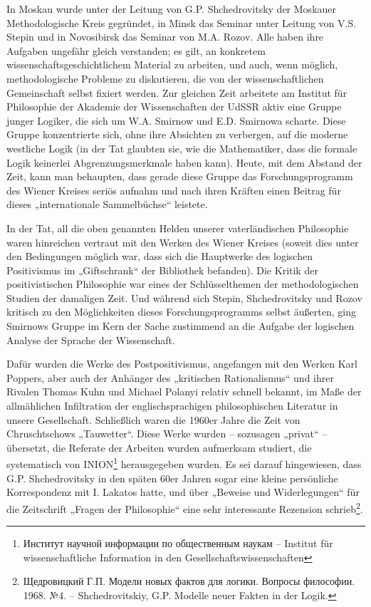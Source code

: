 \documentclass[11pt,a4paper]{article}
\begin{document}
In Moskau wurde unter der Leitung von G.P. Shchedrovitsky der Moskauer
Methodologische Kreis gegründet, in Minsk das Seminar unter Leitung von
V.S. Stepin und in Novosibirsk das Seminar von M.A. Rozov. Alle haben ihre
Aufgaben ungefähr gleich verstanden; es gilt, an konkretem
wissenschaftsgeschichtlichem Material zu arbeiten, und auch, wenn möglich,
methodologische Probleme zu diskutieren, die von der wissenschaftlichen
Gemeinschaft selbst fixiert werden. Zur gleichen Zeit arbeitete am Institut
für Philosophie der Akademie der Wissenschaften der UdSSR aktiv eine Gruppe
junger Logiker, die sich um W.A. Smirnow und E.D. Smirnowa scharte. Diese
Gruppe konzentrierte sich, ohne ihre Absichten zu verbergen, auf die moderne
westliche Logik (in der Tat glaubten sie, wie die Mathematiker, dass die
formale Logik keinerlei Abgrenzungsmerkmale haben kann). Heute, mit dem
Abstand der Zeit, kann man behaupten, dass gerade diese Gruppe das
Forschungsprogramm des Wiener Kreises seriös aufnahm und nach ihren Kräften
einen Beitrag für dieses „internationale Sammelbüchse“ leistete.

In der Tat, all die oben genannten Helden unserer vaterländischen Philosophie
waren hinreichen vertraut mit den Werken des Wiener Kreises (soweit dies unter
den Bedingungen möglich war, dass sich die Hauptwerke des logischen
Positivismus im „Giftschrank“ der Bibliothek befanden). Die Kritik der
positivistischen Philosophie war eines der Schlüsselthemen der
methodologischen Studien der damaligen Zeit. Und während sich Stepin,
Shchedrovitsky und Rozov kritisch zu den Möglichkeiten dieses
Forschungsprogramms selbst äußerten, ging Smirnows Gruppe im Kern der Sache
zustimmend an die Aufgabe der logischen Analyse der Sprache der Wissenschaft.
\enlargethispage{1em}

Dafür wurden die Werke des Postpositivismus, angefangen mit den Werken Karl
Poppers, aber auch der Anhänger des „kritischen Rationalismus“ und ihrer
Rivalen Thomas Kuhn und Michael Polanyi relativ schnell bekannt, im Maße der
allmählichen Infiltration der englischsprachigen philosophischen Literatur in
unsere Gesellschaft.  Schließlich waren die 1960er Jahre die Zeit von
Chruschtschows „Tauwetter“. Diese Werke wurden -- sozusagen „privat“ --
übersetzt, die Referate der Arbeiten wurden aufmerksam studiert, die
systematisch von INION\footnote{\foreignlanguage{russian}{Институт научной
    информации по общественным наукам} -- Institut für wissenschaftliche
  Information in den Gesellschaftswissenschaften} herausgegeben wurden. Es sei
darauf hingewiesen, dass G.P. Shchedrovitsky in den späten 60er Jahren sogar
eine kleine persönliche Korrespondenz mit I. Lakatos hatte, und über „Beweise
und Widerlegungen“ für die Zeitschrift „Fragen der Philosophie“ eine sehr
interessante Rezension schrieb\footnote{\foreignlanguage{russian}{Щедровицкий
    Г.П. Модели новых фактов для логики. Вопросы философии. 1968. №4}. --
  Shchedrovitskiy, G.P. Modelle neuer Fakten in der Logik.}.
\end{document}
